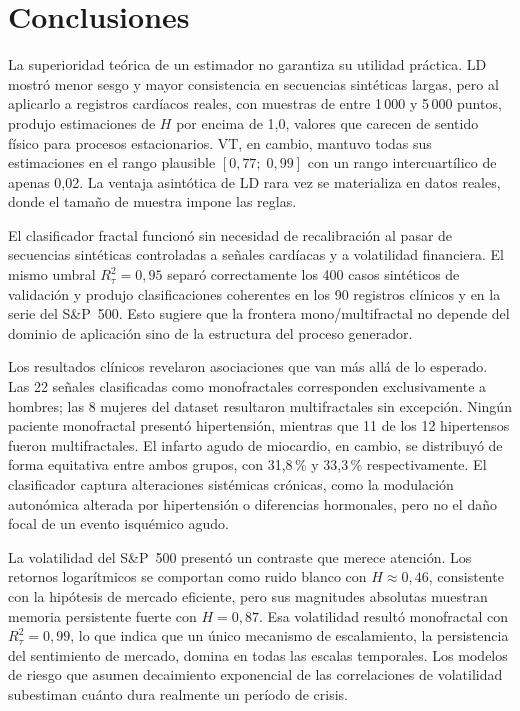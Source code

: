 \section{Conclusiones}

La superioridad teórica de un estimador no garantiza su utilidad
práctica. LD mostró menor sesgo y mayor consistencia en secuencias
sintéticas largas, pero al aplicarlo a registros cardíacos reales,
con muestras de entre 1\,000 y 5\,000 puntos, produjo estimaciones
de $H$ por encima de 1{,}0, valores que carecen de sentido físico para
procesos estacionarios. VT, en cambio, mantuvo todas sus estimaciones en
el rango plausible $[0{,}77;\; 0{,}99]$ con un rango intercuartílico de
apenas 0{,}02. La ventaja asintótica de LD rara vez se materializa en
datos reales, donde el tamaño de muestra impone las reglas.

El clasificador fractal funcionó sin necesidad de recalibración al pasar
de secuencias sintéticas controladas a señales cardíacas y a volatilidad
financiera. El mismo umbral $R^2_{\tau} = 0{,}95$ separó correctamente
los 400 casos sintéticos de validación y produjo clasificaciones
coherentes en los 90 registros clínicos y en la serie del S\&P~500.
Esto sugiere que la frontera mono/multifractal no depende del dominio
de aplicación sino de la estructura del proceso generador.

Los resultados clínicos revelaron asociaciones que van más allá de lo
esperado. Las 22 señales clasificadas como monofractales corresponden
exclusivamente a hombres; las 8 mujeres del dataset resultaron
multifractales sin excepción. Ningún paciente monofractal presentó
hipertensión, mientras que 11 de los 12 hipertensos fueron
multifractales. El infarto agudo de miocardio, en cambio, se distribuyó
de forma equitativa entre ambos grupos, con 31{,}8\,\% y 33{,}3\,\%
respectivamente. El clasificador captura alteraciones sistémicas
crónicas, como la modulación autonómica alterada por hipertensión o
diferencias hormonales, pero no el daño focal de un evento isquémico
agudo.

La volatilidad del S\&P~500 presentó un contraste que merece atención.
Los retornos logarítmicos se comportan como ruido blanco con
$H \approx 0{,}46$, consistente con la hipótesis de mercado eficiente,
pero sus magnitudes absolutas muestran memoria persistente fuerte con
$H = 0{,}87$. Esa volatilidad resultó monofractal con
$R^2_{\tau} = 0{,}99$, lo que indica que un único mecanismo de
escalamiento, la persistencia del sentimiento de mercado, domina en
todas las escalas temporales. Los modelos de riesgo que asumen
decaimiento exponencial de las correlaciones de volatilidad subestiman
cuánto dura realmente un período de crisis.

